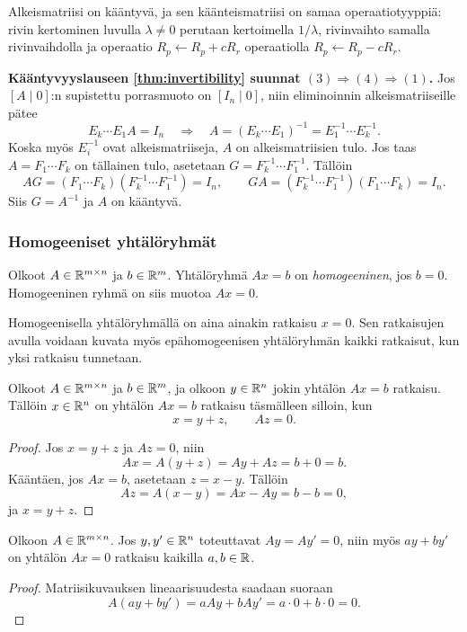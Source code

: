 \documentclass[11pt,a4paper]{amsart}
\begin{document}
  Alkeismatriisi on kääntyvä, ja sen käänteismatriisi on samaa
  operaatiotyyppiä: rivin kertominen luvulla $\lambda\ne0$ perutaan
  kertoimella $1/\lambda$, rivinvaihto samalla rivinvaihdolla ja
  operaatio $R_p\leftarrow R_p+cR_r$ operaatiolla
  $R_p\leftarrow R_p-cR_r$.

  \noindent\textbf{Kääntyvyyslauseen \ref{thm:invertibility}
  suunnat $(3)\Rightarrow(4)\Rightarrow(1)$.}
  Jos $[A\mid0]$:n supistettu porrasmuoto on $[I_n\mid0]$, niin
  eliminoinnin alkeismatriiseille pätee
  \[
    E_k\cdots E_1A=I_n
    \quad\Longrightarrow\quad
    A=(E_k\cdots E_1)^{-1}=E_1^{-1}\cdots E_k^{-1}.
  \]
  Koska myös $E_i^{-1}$ ovat alkeismatriiseja, $A$ on
  alkeismatriisien tulo. Jos taas $A=F_1\cdots F_k$ on tällainen
  tulo, asetetaan $G=F_k^{-1}\cdots F_1^{-1}$. Tällöin
  \[
    AG=(F_1\cdots F_k)(F_k^{-1}\cdots F_1^{-1})=I_n,
    \qquad
    GA=(F_k^{-1}\cdots F_1^{-1})(F_1\cdots F_k)=I_n.
  \]
  Siis $G=A^{-1}$ ja $A$ on kääntyvä.

  \subsubsection*{Homogeeniset yhtälöryhmät}

  \begin{definition}
    Olkoot $A\in\mathbb{R}^{m\times n}$ ja $b\in\mathbb{R}^m$.
    Yhtälöryhmä $Ax=b$ on \emph{homogeeninen}, jos $b=0$.
    Homogeeninen ryhmä on siis muotoa $Ax=0$.
  \end{definition}

  Homogeenisella yhtälöryhmällä on aina ainakin ratkaisu $x=0$.
  Sen ratkaisujen avulla voidaan kuvata myös epähomogeenisen
  yhtälöryhmän kaikki ratkaisut, kun yksi ratkaisu tunnetaan.

  \begin{lemma}\label{lem:particular-homogeneous}
    Olkoot $A\in\mathbb{R}^{m\times n}$ ja $b\in\mathbb{R}^m$, ja olkoon
    $y\in\mathbb{R}^n$ jokin yhtälön $Ax=b$ ratkaisu. Tällöin
    $x\in\mathbb{R}^n$ on yhtälön $Ax=b$ ratkaisu täsmälleen silloin,
    kun
    \[
      \boxed{x=y+z,\qquad Az=0.}
    \]
  \end{lemma}
  \begin{proof}
    Jos $x=y+z$ ja $Az=0$, niin
    \[
      Ax=A(y+z)=Ay+Az=b+0=b.
    \]
    Kääntäen, jos $Ax=b$, asetetaan $z=x-y$. Tällöin
    \[
      Az=A(x-y)=Ax-Ay=b-b=0,
    \]
    ja $x=y+z$.
  \end{proof}

  \begin{lemma}
    Olkoon $A\in\mathbb{R}^{m\times n}$. Jos $y,y'\in\mathbb{R}^n$ toteuttavat
    $Ay=Ay'=0$, niin myös $ay+by'$ on yhtälön $Ax=0$ ratkaisu
    kaikilla $a,b\in\mathbb{R}$.
  \end{lemma}
  \begin{proof}
    Matriisikuvauksen lineaarisuudesta saadaan suoraan
    \[
      A(ay+by')=aAy+bAy'=a\cdot0+b\cdot0=0.
    \]
  \end{proof}
\end{document}
